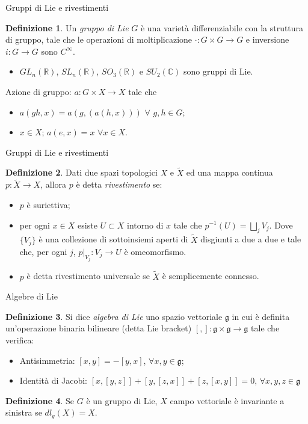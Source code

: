 \documentclass{beamer}
\theoremstyle{definition}
\newtheorem{Def}{Definizione}
\theoremstyle{Theorem}
\theoremstyle{definition}
\theoremstyle{definition}
\theoremstyle{definition}
\begin{document}
\begin{frame} {Gruppi di Lie e rivestimenti}
	\begin{Def}
		Un \textit{gruppo di Lie} $G$ è una varietà differenziabile con la struttura di gruppo, tale che le operazioni di moltiplicazione $\cdot:G\times G\rightarrow G$ e inversione $i:G\rightarrow G$ sono $C^\infty$.
	\end{Def}
\begin{itemize}
	\item $GL_n(\mathbb{R})$, $SL_n(\mathbb{R})$, $SO_3(\mathbb{R})$ e $SU_2(\mathbb{C})$ sono gruppi di Lie.
\end{itemize}\vspace{0.5cm}
Azione di gruppo: $a:G\times X\rightarrow X$ tale che
\begin{itemize}
	\item $a(gh,x)=a(g,(a(h,x)))$ $\forall$ $g,h\in G$; 
	\item $x\in X$; $a(e,x)=x$ $\forall x\in X$.
\end{itemize}
\end{frame}
\begin{frame} {Gruppi di Lie e rivestimenti}
	\begin{Def}
		Dati due spazi topologici $X$ e $\tilde{X}$ ed una mappa continua $p:\tilde{X}\rightarrow X$, allora $p$ è detta \textit{rivestimento} se:
		\begin{itemize}
			\item $p$ è suriettiva;
			\item per ogni $x\in X$ esiste $U\subset X$ intorno di $x$ tale che $p^{-1}(U)=\bigsqcup_j V_j$. Dove $\{V_j\}$ è una collezione di sottoinsiemi aperti di $\tilde{X}$ disgiunti a due a due e tale che, per ogni $j$, $p\rvert_{V_j}:V_j\rightarrow U$ è omeomorfismo. 
		\end{itemize}
	\end{Def}
\vspace{0.5 cm}
\begin{itemize}
	\item $p$ è detta rivestimento universale se $\tilde{X}$ è semplicemente connesso.
\end{itemize}
\end{frame}
\begin{frame} {Algebre di Lie}
	\begin{Def}
		Si dice \textit{algebra di Lie} uno spazio vettoriale $\mathfrak{g}$ in cui è definita un'operazione binaria bilineare (detta Lie bracket) $[,]:\mathfrak{g}\times\mathfrak{g}\rightarrow\mathfrak{g}$ tale che verifica:
	\begin{itemize}
		\item Antisimmetria: $[x,y]=-[y,x]$, $\forall x,y\in\mathfrak{g}$;
		\item Identità di Jacobi: $[x,[y,z]]+[y,[z,x]]+[z,[x,y]]=0$, $\forall x,y,z\in \mathfrak{g}$ 
	\end{itemize}
\end{Def}
\begin{Def}
	Se $G$ è un gruppo di Lie, $X$ campo vettoriale è invariante a sinistra se $dl_g(X)=X$.
\end{Def}
\end{frame}
\end{document}
